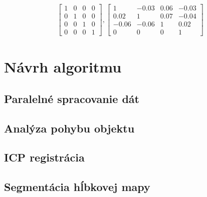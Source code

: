 \begin{equation}
\label{eq:multi:calib:a}
\begin{aligned}
\begin{bmatrix}
1 & 0 & 0 & 0 \\
0 & 1 & 0 & 0 \\
0 & 0 & 1 & 0 \\
0 & 0 & 0 & 1 
\end{bmatrix}, 
\begin{bmatrix}
1 & -0.03 & 0.06 & -0.03 \\
0.02 & 1 & 0.07 & -0.04 \\
-0.06 & -0.06 & 1 & 0.02 \\
0 & 0 & 0 & 1 
\end{bmatrix}
\end{aligned}
\end{equation}




\section{Návrh algoritmu}


\subsection{Paralelné spracovanie dát}

\subsection{Analýza pohybu objektu}

\subsection{ICP registrácia}

\subsection{Segmentácia hĺbkovej mapy}
